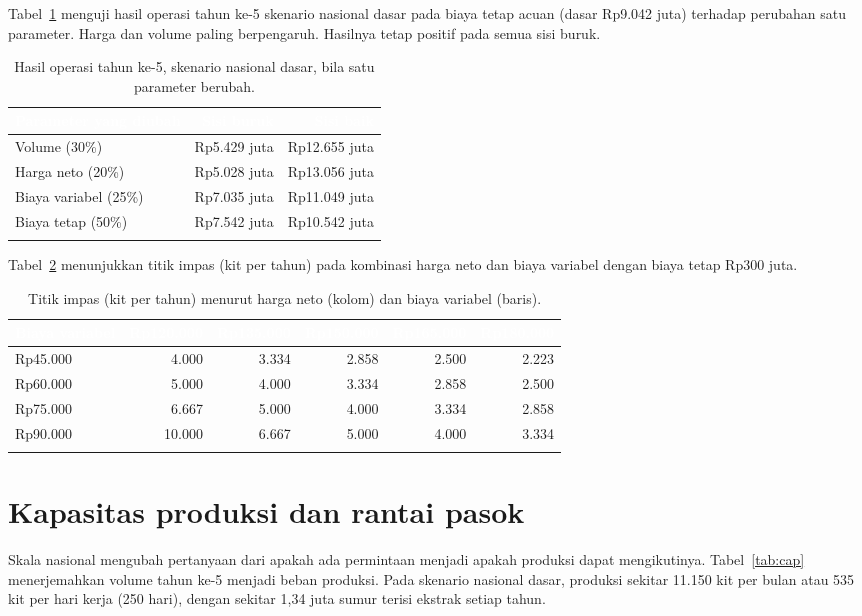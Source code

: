 \documentclass[11pt,a4paper]{article}
\newcommand{\tH}[1]{\textcolor{white}{\sffamily\bfseries\small #1}}
\newcommand{\tabstart}{\small\rowcolors{2}{white}{pale}\arrayrulecolor{rule}}
\newcommand{\hdrrow}{\rowcolor{tealdark}}
\renewcommand{\toprule}{\arrayrulecolor{tealdark}\specialrule{0.9pt}{0pt}{0pt}\arrayrulecolor{rule}}
\renewcommand{\bottomrule}{\arrayrulecolor{tealdark}\specialrule{0.9pt}{0pt}{0pt}\arrayrulecolor{rule}}
\begin{document}
Tabel~\ref{tab:tor} menguji hasil operasi tahun ke-5 skenario nasional dasar pada biaya tetap acuan (dasar Rp9.042 juta) terhadap perubahan satu parameter. Harga dan volume paling berpengaruh. Hasilnya tetap positif pada semua sisi buruk.

\begin{table}[htbp]
\centering
\caption{Hasil operasi tahun ke-5, skenario nasional dasar, bila satu parameter berubah.}
\label{tab:tor}
\tabstart
\begin{tabular}{@{}lrr@{}}
\toprule
\hdrrow\tH{Parameter yang diubah} & \tH{Sisi buruk} & \tH{Sisi baik} \\
\midrule
Volume (30\%) & Rp5.429 juta & Rp12.655 juta \\
Harga neto (20\%) & Rp5.028 juta & Rp13.056 juta \\
Biaya variabel (25\%) & Rp7.035 juta & Rp11.049 juta \\
Biaya tetap (50\%) & Rp7.542 juta & Rp10.542 juta \\
\bottomrule
\end{tabular}
\end{table}

Tabel~\ref{tab:bep} menunjukkan titik impas (kit per tahun) pada kombinasi harga neto dan biaya variabel dengan biaya tetap Rp300 juta.

\begin{table}[htbp]
\centering
\caption{Titik impas (kit per tahun) menurut harga neto (kolom) dan biaya variabel (baris).}
\label{tab:bep}
\tabstart
\begin{tabular}{@{}lrrrrr@{}}
\toprule
\hdrrow\tH{Biaya variabel} & \tH{Rp120.000} & \tH{Rp135.000} & \tH{Rp150.000} & \tH{Rp165.000} & \tH{Rp180.000} \\
\midrule
Rp45.000 & 4.000 & 3.334 & 2.858 & 2.500 & 2.223 \\
Rp60.000 & 5.000 & 4.000 & 3.334 & 2.858 & 2.500 \\
Rp75.000 & 6.667 & 5.000 & 4.000 & 3.334 & 2.858 \\
Rp90.000 & 10.000 & 6.667 & 5.000 & 4.000 & 3.334 \\
\bottomrule
\end{tabular}
\end{table}

\section{Kapasitas produksi dan rantai pasok}

Skala nasional mengubah pertanyaan dari apakah ada permintaan menjadi apakah produksi dapat mengikutinya. Tabel~\ref{tab:cap} menerjemahkan volume tahun ke-5 menjadi beban produksi. Pada skenario nasional dasar, produksi sekitar 11.150 kit per bulan atau 535 kit per hari kerja (250 hari), dengan sekitar 1,34 juta sumur terisi ekstrak setiap tahun.
\end{document}
